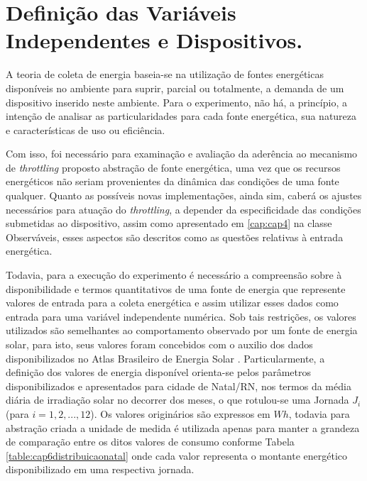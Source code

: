 \section{Definição das Variáveis Independentes e Dispositivos.}
\label{cap6:variaveisdispositivos}
A teoria de coleta de energia baseia-se na utilização de fontes energéticas disponíveis no ambiente para suprir, parcial ou totalmente, a demanda de um dispositivo inserido neste ambiente. Para o experimento, não há, a princípio, a intenção de analisar as particularidades para cada fonte energética, sua natureza e características de uso ou eficiência. 

Com isso, foi necessário para examinação e avaliação da aderência ao mecanismo de \textit{throttling} proposto abstração de fonte energética, uma vez que os recursos energéticos não seriam provenientes da dinâmica das condições de uma fonte qualquer. Quanto as possíveis novas implementações, ainda sim, caberá os ajustes necessários para atuação do \textit{throttling},  a depender da especificidade das condições submetidas ao dispositivo, assim como apresentado em \ref{cap:cap4} na classe Observáveis, esses aspectos são descritos como as questões relativas à entrada energética. 

Todavia, para a execução do experimento é necessário a compreensão sobre à disponibilidade e termos quantitativos de uma fonte de energia que represente valores de entrada para a coleta energética e assim utilizar esses dados como entrada para uma variável independente numérica. Sob tais restrições, os valores utilizados são semelhantes ao comportamento observado por um fonte de energia solar, para isto, seus valores foram concebidos com o auxilio dos dados disponibilizados no Atlas Brasileiro de Energia Solar \cite{martins2017atlas}. Particularmente, a definição dos valores de energia disponível orienta-se pelos parâmetros disponibilizados e apresentados para cidade de Natal/RN, nos termos da média diária de irradiação solar no decorrer  dos meses, o que rotulou-se uma Jornada $J_i$ (para $i = 1,2,...,12$). Os valores originários são expressos em  $Wh$, todavia para abstração criada a unidade de medida é utilizada apenas para manter a grandeza de comparação entre os ditos valores de consumo conforme Tabela \ref{table:cap6distribuicaonatal} onde cada valor representa o montante energético disponibilizado em uma respectiva jornada.

\begingroup

\setlength{\tabcolsep}{10pt} %
\renewcommand{\arraystretch}{1.5} %

